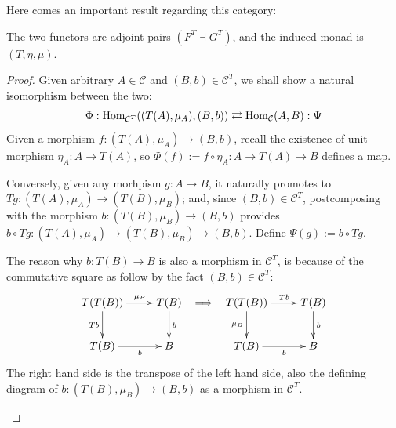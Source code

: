 \documentclass{article}
\begin{document}
Here comes an important result regarding this category:
\begin{thm}
    The two functors are adjoint pairs $(F^T\dashv G^T)$, and the induced monad is $(T,\eta,\mu)$.
\end{thm}
\begin{proof}
    Given arbitrary $A\in\mathcal{C}$ and $(B,b)\in\mathcal{C}^T$, we shall show a natural isomorphism between the two:
    \[\Phi:\mathrm{Hom}_{\mathcal{C}^T}((T(A),\mu_A), (B,b))\rightleftarrows \mathrm{Hom}_\mathcal{C}(A,B):\Psi\]
    Given a morphism $f:(T(A),\mu_A)\rightarrow (B,b)$, recall the existence of unit morphism $\eta_A:A\rightarrow T(A)$, so $\Phi(f):= f\circ \eta_A:A\rightarrow T(A)\rightarrow B$ defines a map. 
    
    Conversely, given any morhpism $g:A\rightarrow B$, it naturally promotes to $Tg:(T(A),\mu_A)\rightarrow (T(B),\mu_B)$; and, since $(B,b)\in\mathcal{C}^T$, postcomposing with the morphism $b:(T(B),\mu_B)\rightarrow (B,b)$ provides $b\circ Tg:(T(A),\mu_A)\rightarrow (T(B),\mu_B)\rightarrow  (B,b)$. Define $\Psi(g):= b\circ Tg$.

    \begin{rem}
        The reason why $b:T(B)\rightarrow B$ is also a morphism in $\mathcal{C}^T$, is because of the commutative square as follow by the fact $(B,b)\in\mathcal{C}^T$:
        \[\xymatrix{
            T(T(B)) \ar[r]^-{\mu_B} \ar[d]_-{Tb} & T(B) \ar[d]^-{b}\\
            T(B) \ar[r]_-{b} & B
        }\ \implies \ \xymatrix{
            T(T(B)) \ar[r]^-{Tb} \ar[d]_-{\mu_B} & T(B) \ar[d]^-{b}\\
            T(B) \ar[r]_-{b} & B
        }\]
        The right hand side is the transpose of the left hand side, also the defining diagram of $b:(T(B),\mu_B)\rightarrow (B,b)$ as a morphism in $\mathcal{C}^T$.
    \end{rem}


\end{proof}
\end{document}
